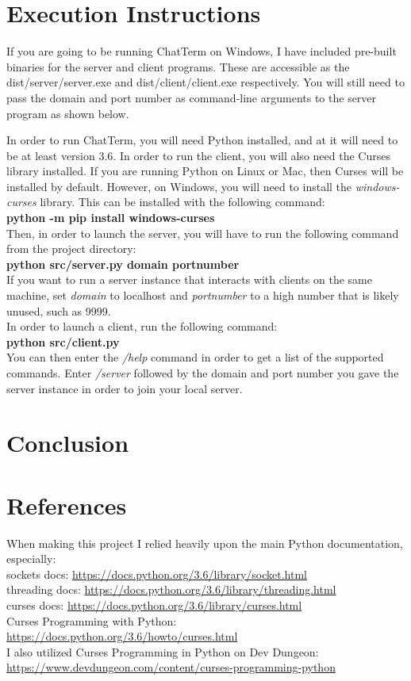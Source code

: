 \documentclass{article}
\begin{document}
    \section{Execution Instructions} 
    If you are going to be running ChatTerm on Windows, I have included
    pre-built binaries for the server and client programs. These are accessible
    as the dist/server/server.exe and dist/client/client.exe respectively. You
    will still need to pass the domain and port number as command-line arguments
    to the server program as shown below.

    In order to run ChatTerm, you will need Python installed, and at it will
    need to be at least version 3.6. In order to run the client, you will also
    need the Curses library installed. If you are running Python on Linux or
    Mac, then Curses will be installed by default. However, on Windows, you will
    need to install the \emph{windows-curses} library. This can be installed
    with the following command:\\
    \textbf{python -m pip install windows-curses}\\
    Then, in order to launch the server, you will have to run the following
    command from the project directory:\\
    \textbf{python src/server.py domain portnumber}\\
    If you want to run a server instance that interacts with clients on the same
    machine, set \emph{domain} to localhost and \emph{portnumber} to a high
    number that is likely unused, such as 9999.\\
    In order to launch a client, run the following command:\\
    \textbf{python src/client.py}\\
    You can then enter the \emph{/help} command in order to get a list of the
    supported commands. Enter \emph{/server} followed by the domain and port
    number you gave the server instance in order to join your local server.
    \section{Conclusion}
    \section{References}
    When making this project I relied heavily upon the main Python
    documentation, especially:\\
    sockets docs: \url{https://docs.python.org/3.6/library/socket.html}\\
    threading docs: \url{https://docs.python.org/3.6/library/threading.html}\\
    curses docs: \url{https://docs.python.org/3.6/library/curses.html}\\
    Curses Programming with Python:
    \url{https://docs.python.org/3.6/howto/curses.html}\\
    I also utilized Curses Programming in Python on Dev Dungeon:
    \url{https://www.devdungeon.com/content/curses-programming-python}\\
\end{document}
